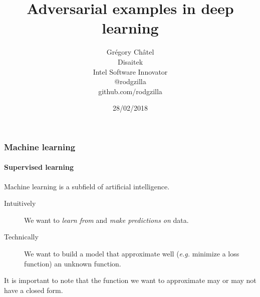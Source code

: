 \documentclass[9pt]{beamer}
\title{Adversarial examples in deep learning}
\author[G. Châtel]{Grégory Châtel\\\vspace{0.3cm}Disaitek\\Intel
  Software Innovator\\\vspace{0.3cm}@rodgzilla\\github.com/rodgzilla}
\date{28/02/2018}
\begin{document}

\begin{frame}

  \maketitle

\end{frame}

\begin{frame}

  \frametitle{Machine learning}

  \framesubtitle{Supervised learning}

  Machine learning is a subfield of artificial intelligence.

  \bigskip

  \begin{description}
    \item[Intuitively] We want to \emph{learn from} and \emph{make predictions
    on} data.

    \item[Technically] We want to build a model that approximate well
      (\textit{e.g.} minimize a loss function) an unknown function.
  \end{description}

  \bigskip

  It is important to note that the function we want to approximate may
  or may not have a closed form.
\end{frame}
\end{document}
